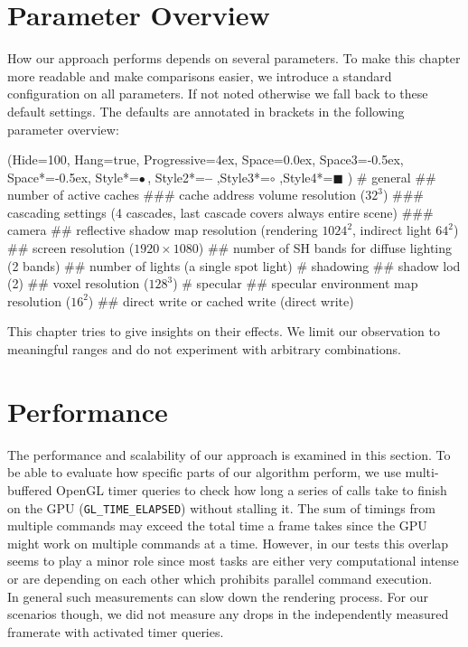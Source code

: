\documentclass[thesis.tex]{subfiles}
\begin{document}
\section{Parameter Overview}
How our approach performs depends on several parameters.
To make this chapter more readable and make comparisons easier, we introduce a standard configuration on all parameters.
If not noted otherwise we fall back to these default settings.
The defaults are annotated in brackets in the following parameter overview:
\begin{easylist}
\ListProperties(Hide=100, Hang=true, Progressive=4ex, Space=0.0ex, Space3=-0.5ex, Space*=-0.5ex, Style*=$\bullet\,$,
Style2*=\textbf{--} ,Style3*=$\circ$ ,Style4*=\tiny$\blacksquare$ )
# general
## number of active caches
### cache address volume resolution ($32^3$)
### cascading settings (4 cascades, last cascade covers always entire scene)
### camera
## reflective shadow map resolution (rendering $1024^2$, indirect light $64^2$)
## screen resolution ($1920\times1080$)
## number of SH bands for diffuse lighting (2 bands)
## number of lights (a single spot light)
# shadowing
## shadow lod (2)
## voxel resolution ($128^3$)
# specular
## specular environment map resolution ($16^2$)
## direct write or cached write (direct write)
\end{easylist}
This chapter tries to give insights on their effects.
We limit our observation to meaningful ranges and do not experiment with arbitrary combinations.

\section{Performance}
The performance and scalability of our approach is examined in this section.
To be able to evaluate how specific parts of our algorithm perform, we use multi-buffered OpenGL timer queries to check how long a series of calls take to finish on the GPU (\texttt{GL\_TIME\_ELAPSED}) without stalling it.
The sum of timings from multiple commands may exceed the total time a frame takes since the GPU might work on multiple commands at a time.
However, in our tests this overlap seems to play a minor role since most tasks are either very computational intense or are depending on each other which prohibits parallel command execution.
\\
In general such measurements can slow down the rendering process.
For our scenarios though, we did not measure any drops in the independently measured framerate with activated timer queries.
\end{document}
